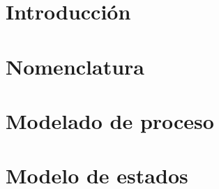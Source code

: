 \documentclass[10pt]{book}
\author{Alianza}
\begin{document}
	
	
	\thispagestyle{empty}
	
	\vspace{2cm}
	
\frontmatter
\tableofcontents
\listoffigures
	\mainmatter
	
		\chapter{Introducción}
	    \chapter{Nomenclatura}
	
	
	
	\chapter{Modelado de proceso}
	
	\chapter{Modelo de estados}
%		
	
\end{document}

